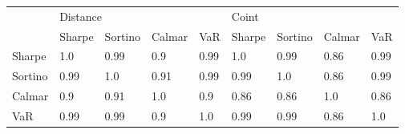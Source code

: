 \begin{tabular}{lllllllll}
\toprule
{} & \multicolumn{4}{l}{Distance} & \multicolumn{4}{l}{Coint} \\
{} &   Sharpe & Sortino & Calmar &   VaR & Sharpe & Sortino & Calmar &   VaR \\
\midrule
Sharpe  &      1.0 &    0.99 &    0.9 &  0.99 &    1.0 &    0.99 &   0.86 &  0.99 \\
Sortino &     0.99 &     1.0 &   0.91 &  0.99 &   0.99 &     1.0 &   0.86 &  0.99 \\
Calmar  &      0.9 &    0.91 &    1.0 &   0.9 &   0.86 &    0.86 &    1.0 &  0.86 \\
VaR     &     0.99 &    0.99 &    0.9 &   1.0 &   0.99 &    0.99 &   0.86 &   1.0 \\
\bottomrule
\end{tabular}
